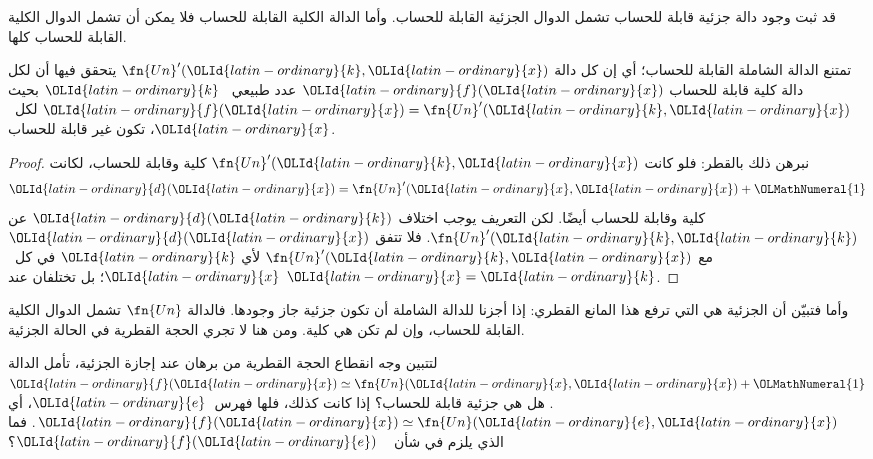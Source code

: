 \documentclass[../../../include/open-logic-section]{subfiles}
\begin{document}

قد ثبت وجود دالة جزئية قابلة للحساب تشمل الدوال الجزئية القابلة للحساب.
وأما الدالة الكلية القابلة للحساب فلا يمكن أن تشمل الدوال الكلية القابلة للحساب كلها.

\begin{thm}
تمتنع الدالة الشاملة القابلة للحساب؛ أي إن كل دالة
$\fn{Un}'({\OLId{latin-ordinary}{k}},{\OLId{latin-ordinary}{x}})$ يتحقق فيها أن لكل دالة كلية قابلة للحساب ${\OLId{latin-ordinary}{f}}({\OLId{latin-ordinary}{x}})$ عدد طبيعي
~${\OLId{latin-ordinary}{k}}$ بحيث ${\OLId{latin-ordinary}{f}}({\OLId{latin-ordinary}{x}})=\fn{Un}'({\OLId{latin-ordinary}{k}},{\OLId{latin-ordinary}{x}})$ لكل~${\OLId{latin-ordinary}{x}}$، تكون غير قابلة
للحساب.
\end{thm}

\begin{proof}
نبرهن ذلك بالقطر: فلو كانت $\fn{Un}'({\OLId{latin-ordinary}{k}},{\OLId{latin-ordinary}{x}})$ كلية وقابلة للحساب،
لكانت
\[
{\OLId{latin-ordinary}{d}}({\OLId{latin-ordinary}{x}}) = \fn{Un}'({\OLId{latin-ordinary}{x}}, {\OLId{latin-ordinary}{x}}) + {\OLMathNumeral{1}}
\]
كلية وقابلة للحساب أيضًا. لكن التعريف يوجب اختلاف ${\OLId{latin-ordinary}{d}}({\OLId{latin-ordinary}{k}})$ عن
$\fn{Un}'({\OLId{latin-ordinary}{k}},{\OLId{latin-ordinary}{k}})$. فلا تتفق ${\OLId{latin-ordinary}{d}}({\OLId{latin-ordinary}{x}})$ مع $\fn{Un}'({\OLId{latin-ordinary}{k}},{\OLId{latin-ordinary}{x}})$ لأي
${\OLId{latin-ordinary}{k}}$ في كل~${\OLId{latin-ordinary}{x}}$؛ بل تختلفان عند ${\OLId{latin-ordinary}{x}}={\OLId{latin-ordinary}{k}}$.
\end{proof}

\begin{explain}
وأما  فتبيّن أن الجزئية هي التي ترفع هذا
المانع القطري: إذا أجزنا للدالة الشاملة أن تكون جزئية جاز وجودها. فالدالة
$\fn{Un}$ تشمل الدوال الكلية القابلة للحساب، وإن لم تكن هي كلية. ومن هنا
لا تجري الحجة القطرية في الحالة الجزئية.
\end{explain}

\begin{prob}
  لتتبين وجه انقطاع الحجة القطرية من برهان  عند
  إجازة الجزئية، تأمل الدالة
  ${\OLId{latin-ordinary}{f}}({\OLId{latin-ordinary}{x}})\simeq\fn{Un}({\OLId{latin-ordinary}{x}},{\OLId{latin-ordinary}{x}})+{\OLMathNumeral{1}}$. هل هي جزئية قابلة للحساب؟ إذا كانت كذلك،
  فلها فهرس~${\OLId{latin-ordinary}{e}}$، أي ${\OLId{latin-ordinary}{f}}({\OLId{latin-ordinary}{x}})\simeq\fn{Un}({\OLId{latin-ordinary}{e}},{\OLId{latin-ordinary}{x}})$. فما الذي يلزم في شأن
  ~ ${\OLId{latin-ordinary}{f}}({\OLId{latin-ordinary}{e}})$؟
\end{prob}
\end{document}
